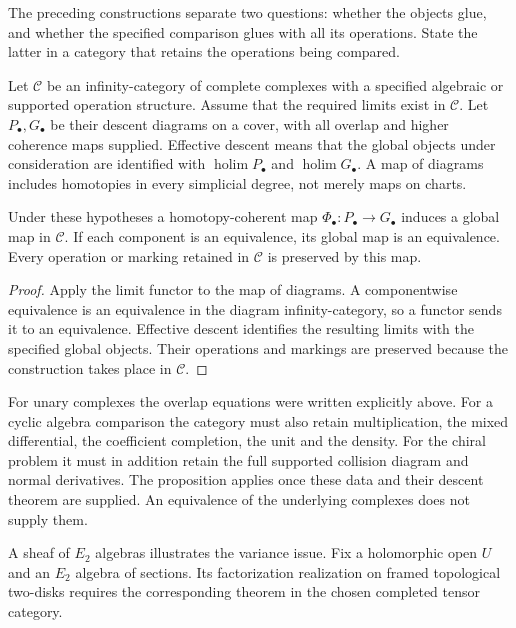 The preceding constructions separate two questions: whether the
objects glue, and whether the specified comparison glues with all
its operations. State the latter in a category that retains the
operations being compared.

Let $\mathcal C$ be an infinity-category of complete complexes
with a specified algebraic or supported operation structure.
Assume that the required limits exist in $\mathcal C$. Let
$P_\bullet,G_\bullet$ be their descent diagrams on a cover, with
all overlap and higher coherence maps supplied. Effective descent
means that the global objects under consideration are identified
with $\operatorname*{holim}P_\bullet$ and
$\operatorname*{holim}G_\bullet$. A map of diagrams includes
homotopies in every simplicial degree, not merely maps on charts.

\begin{proposition}\label{mht:prop:structured-global-descent}
Under these hypotheses a homotopy-coherent map
$\Phi_\bullet:P_\bullet\to G_\bullet$ induces a global map in
$\mathcal C$. If each component is an equivalence, its global
map is an equivalence. Every operation or marking retained in
$\mathcal C$ is preserved by this map.
\end{proposition}

\begin{proof}
Apply the limit functor to the map of diagrams. A componentwise
equivalence is an equivalence in the diagram infinity-category,
so a functor sends it to an equivalence. Effective descent
identifies the resulting limits with the specified global
objects. Their operations and markings are preserved because
the construction takes place in $\mathcal C$.
\end{proof}

For unary complexes the overlap equations were written explicitly
above. For a cyclic algebra comparison the category must also
retain multiplication, the mixed differential, the coefficient
completion, the unit and the density. For the chiral problem it
must in addition retain the full supported collision diagram and
normal derivatives. The proposition applies once these data and
their descent theorem are supplied. An equivalence of the
underlying complexes does not supply them.

A sheaf of $E_2$ algebras illustrates the variance issue.
Fix a holomorphic open $U$ and an $E_2$ algebra of sections.
Its factorization realization on framed topological two-disks
requires the corresponding theorem in the chosen completed tensor
category.

